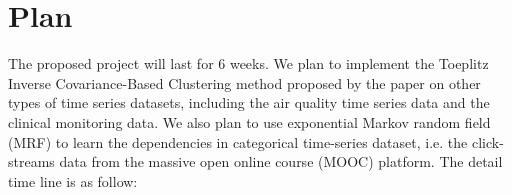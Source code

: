 \documentclass{llncs}
\begin{document}



\section{Plan}

The proposed project will last for 6 weeks. We plan to implement the Toeplitz Inverse Covariance-Based Clustering method proposed by the paper \cite{tiic} on other types of time series datasets, including the air quality time series data and the clinical monitoring data. We also plan to use exponential Markov random field (MRF) to learn the dependencies in categorical time-series dataset, i.e. the click-streams data from the massive open online course (MOOC) platform. The detail time line is as follow:
\end{document}

